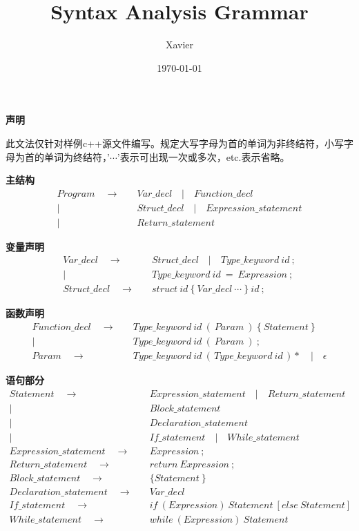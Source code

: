 \documentclass[11pt]{article}
\author{Xavier}
\date{\today}
\title{Syntax Analysis Grammar}
\begin{document}
    \begin{titlepage}
        \maketitle
        \centering
        \vspace*{\fill}
        {\Large \textbf{\LARGE 声明} \\[1.5cm]
        \parbox{1\textwidth}{此文法仅针对样例c++源文件编写。规定大写字母为首的单词为非终结符，小写字母为首的单词为终结符，'$\cdots$'表示可出现一次或多次，etc.表示省略。}
        }
    \end{titlepage}
    
    \centering
    \textbf{主结构}
    \begin{align*}
        Program \quad \to&\quad Var\_decl \quad |\quad Function\_decl \\
        |&\quad Struct\_decl \quad |\quad Expression\_statement \\
        |&\quad Return\_statement
    \end{align*}

    \textbf{变量声明}
    \begin{align*}
        Var\_decl \quad \to&\quad Struct\_decl \quad |\quad Type\_keyword\ id\ ; \\
        |&\quad Type\_keyword\ id\ =\ Expression\ ; \\
        Struct\_decl \quad \to&\quad struct\ id\ \{\ Var\_decl\ \cdots\ \}\ id\ ;
    \end{align*}

    \textbf{函数声明}
    \begin{align*}
        Function\_decl \quad \to&\quad Type\_keyword\ id \ (\ Param\ ) \ \{\ Statement\ \} \\
        |&\quad Type\_keyword\ id\ (\ Param\ )\ ; \\
        Param \quad \to&\quad Type\_keyword\ id\ (\,Type\_keyword\ id\,)* \quad |\quad \epsilon
    \end{align*}

    \textbf{语句部分}
    \begin{align*}
        Statement \quad \to&\quad Expression\_statement\quad |\quad Return\_statement \\ | &\quad Block\_statement \\|&\quad Declaration\_statement\\|&\quad If\_statement\quad |\quad While\_statement \\
        Expression\_statement \quad \to&\quad Expression\ ; \\
        Return\_statement \quad \to&\quad return\ Expression\ ; \\
        Block\_statement \quad \to&\quad \{ Statement\ \} \\
        Declaration\_statement \quad \to&\quad Var\_decl \\
        If\_statement \quad \to&\quad if\ ( Expression ) \ Statement\ [else\ Statement] \\
        While\_statement \quad \to&\quad while\ ( Expression ) \ Statement
    \end{align*}
\end{document}
